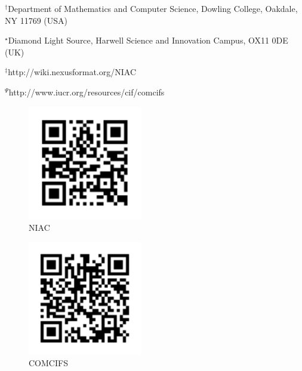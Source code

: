 \documentclass[11pt]{a0poster}
\begin{document}
\begin{minipage}[]{.4\linewidth}
\begin{center}
\vspace{8mm}

{\fontsize{24}{28}\selectfont $^{\dagger}$Department of Mathematics and Computer Science, Dowling College, Oakdale, NY 11769 (USA)}

{\fontsize{24}{28}\selectfont $^{\star}$Diamond Light Source, Harwell Science and
Innovation Campus, OX11 0DE (UK)}

{\fontsize{24}{28}\selectfont $^{\ddag}${http://wiki.nexusformat.org/NIAC}}

{\fontsize{24}{28}\selectfont $^{\Psi}${http://www.iucr.org/resources/cif/comcifs}}
\vspace{4mm}
\end{center}
\end{minipage}\hfill%
\begin{minipage}[]{.10\linewidth}
\begin{figure}[H]
\begin{center}
\includegraphics[width=50mm]{niac_qr}
{~~\\
NIAC}
\end{center}
\end{figure}
\end{minipage}\hfill%
\begin{minipage}[]{.10\linewidth}
\begin{figure}[H]
\begin{center}
\includegraphics[width=50mm]{comcifs_qr}
{~~\\
COMCIFS}
\end{center}
\end{figure}
\end{minipage}
\end{document}
